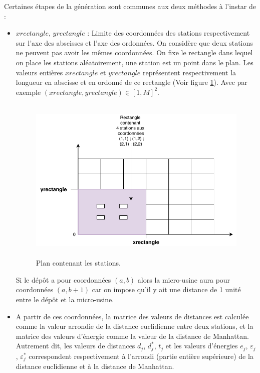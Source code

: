 {Certaines étapes de la génération sont communes aux deux méthodes à l'instar de :
\begin{itemize}[label=$\square$]
	\item$xrectangle$, $yrectangle$ : Limite des coordonnées des stations respectivement sur l'axe des abscisses et l'axe des ordonnées. On considère que deux stations ne peuvent pas avoir les mêmes coordonnées. On fixe le rectangle dans lequel on place les stations aléatoirement, une station est un point dans le plan. Les valeurs entières $xrectangle$ et $yrectangle$ représentent respectivement la longueur en abscisse et en ordonné de ce rectangle (Voir figure \ref{Fr_gen_station}). Avec par exemple $(xrectangle,yrectangle) \in [1, M]^2 $. 
	\begin{figure}[H]
		\centerline{
			\includegraphics[height=8cm]{images_these/gen_station.pdf}}
		\caption[Plan contenant les stations]{Plan contenant les stations.}
		\label{Fr_gen_station}
	\end{figure}
	Si le dépôt a pour coordonnées $(a,b)$ alors la micro-usine aura pour coordonnées $(a,b+1)$ car on impose qu'il y ait une distance de 1 unité entre le dépôt et la micro-usine.
	
	\item A partir de ces coordonnées, la matrice des valeurs de distances est calculée comme la valeur arrondie de la distance euclidienne
	entre deux stations, et la matrice des valeurs d'énergie comme la valeur de la distance de Manhattan.
	Autrement dit, les valeurs de distances $d_j$, $d^*_j$, $t_j$ et les valeurs d'énergies $e_j$, $\varepsilon_j$, $\varepsilon^*_j$ correspondent respectivement à l'arrondi (partie entière supérieure) de la distance euclidienne et à la distance de Manhattan.
\end{itemize}
}
